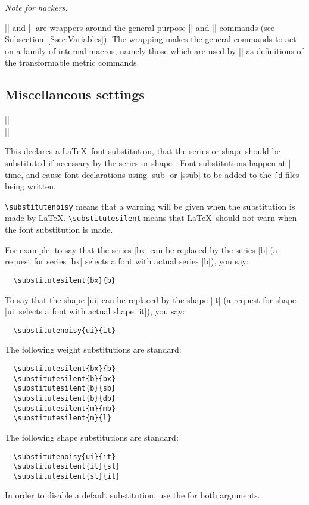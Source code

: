 \documentclass[a4paper]{ltxguide}
\newenvironment{hackernote}{%
   \list{}{
     \setlength{\leftmargin}{0pt}%
     \setlength\labelwidth{0pt}%
     \setlength{\listparindent}{1.4em}%
     \setlength{\parsep}{0pt plus 1pt}%
     \setlength{\itemsep}{\medskipamount}%
   }\item[]%
   \small
   \textit{Note for hackers.}\hspace{0.5em}%
}{\endlist}
\newcommand*{\meta}{\m}
\newcommand*{\setfilename}[1]{\texttt{#1}}
\newcommand{\fd} {\setfilename{fd}\xspace}
\begin{document}
\begin{hackernote}
  |\offmtxcommand| and |\onmtxcommand| are wrappers around the 
  general-purpose |\offcommand| and |\oncommand| commands (see 
  Subsection~\ref{Ssec:Variables}). The wrapping makes the general 
  commands to act on a family of internal macros, namely those which 
  are used by |\reglyphfont| as definitions of the transformable 
  metric commands.
\end{hackernote}


\subsection{Miscellaneous settings}

\begin{decl}
  |\substitutesilent|\\
  |\substitutenoisy|
\end{decl}
This declares a \LaTeX\ font substitution, that the series or shape
 should be substituted if necessary by the series or shape
.  Font substitutions happen at |\endinstallfonts| time, and 
cause font declarations using |sub| or |ssub| to be added to the \fd 
files being written.

\verb|\substitutenoisy| means that a warning will be given when 
the substitution is made by \LaTeX.
\verb|\substitutesilent| means that \LaTeX\ should not warn when 
the font substitution is made.

For example, to say that the series |bx| can be replaced by the
series |b| (a request for series |bx| selects a font with actual series 
|b|), you say:
\begin{verbatim}
  \substitutesilent{bx}{b}
\end{verbatim}
To say that the shape |ui| can be replaced by the shape |it| (a 
request for shape |ui| selects a font with actual shape |it|), you say:
\begin{verbatim}
  \substitutenoisy{ui}{it}
\end{verbatim}

The following weight substitutions are standard:
\begin{verbatim}
  \substitutesilent{bx}{b}
  \substitutesilent{b}{bx}
  \substitutesilent{b}{sb}
  \substitutesilent{b}{db}
  \substitutesilent{m}{mb}
  \substitutesilent{m}{l}
\end{verbatim}
The following shape substitutions are standard:
\begin{verbatim}
  \substitutenoisy{ui}{it}
  \substitutesilent{it}{sl}
  \substitutesilent{sl}{it}
\end{verbatim}
In order to disable a default substitution, use the \meta{from} for 
both arguments.
\end{document}
